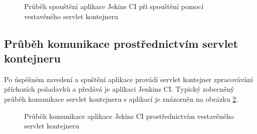             \begin{figure}[h!t]
                \begin{center}
                    \caption{Průběh spouštění aplikace Jekins CI při spouštění pomocí vestavěného servlet kontejneru}
                    \label{imgArchitekturaSpusteni}
                \end{center}
            \end{figure}


        \subsection{Průběh komunikace prostřednictvím servlet kontejneru}
            Po úspěšném zavedení a spuštění aplikace provádí servlet kontejner
            zpracovávání příchozích požadavků a předává je aplikaci Jenkins CI. 
            Typický zobecněný průběh komunikace servlet kontejneru s aplikací je znázorněn
            na obrázku \ref{imgKomunikace}. 

            \begin{figure}[h!t]
                \begin{center}
                    \caption{Průběh komunikace aplikace Jekins CI prostřednictvím vestavěného servlet kontejneru}
                    \label{imgKomunikace}
                \end{center}
            \end{figure}

